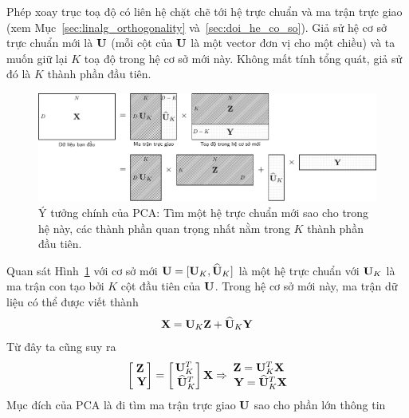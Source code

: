 Phép xoay trục toạ độ có liên hệ chặt chẽ tới hệ trực chuẩn và ma trận trực giao
(xem Mục~\ref{sec:linalg_orthogonality} và~\ref{sec:doi_he_co_so}). Giả sử hệ cơ
sở trực chuẩn mới là $\mathbf{U}$ (mỗi cột của $\mathbf{U}$ là một vector đơn vị cho
một chiều) và ta muốn giữ lại $K$ toạ độ trong hệ
cơ sở mới này. Không mất tính tổng quát, giả sử đó là $K$ thành phần đầu tiên.
\begin{figure}[t]
    \centering
    \includegraphics[width = \textwidth]{Chapters/07_DimemsionalityReduction/27_pca/latex/pca_idea.pdf}
    \caption[]{Ý tưởng chính của PCA: Tìm một hệ trực chuẩn mới sao cho trong hệ này, các thành phần quan trọng nhất nằm trong $K$ thành phần đầu tiên.}
    \label{fig:27_3}
\end{figure}
Quan sát Hình~\ref{fig:27_3} với cơ sở mới $\mathbf{U} =
    [\mathbf{U}_K, \widehat{\mathbf{U}}_K]$ là một hệ trực chuẩn với $\mathbf{U}_K$ là ma trận con tạo bởi $K$ cột đầu tiên của $\mathbf{U}$. Trong hệ cơ sở mới này, ma trận dữ liệu có thể được viết thành
\begin{equation}
    \label{eqn:27_8}
    \mathbf{X} = \mathbf{U}_K \mathbf{Z} + \widehat{\mathbf{U}}_K \mathbf{Y}
\end{equation}
Từ đây ta cũng suy ra
\begin{eqnarray}
    \label{eqn:27_9}
    \left[\begin{matrix} \mathbf{Z} \\\ \mathbf{Y} \end{matrix} \right] =
    \left[\begin{matrix} \mathbf{U}_K^T \\\ \widehat{\mathbf{U}}_K^T \end{matrix} \right]\mathbf{X} \Rightarrow
    \begin{matrix}
        \mathbf{Z} = \mathbf{U}_K^T \mathbf{X} \\\
        \mathbf{Y} = \widehat{\mathbf{U}}_K^T\mathbf{X}
    \end{matrix}
\end{eqnarray}
Mục đích của PCA là đi tìm ma trận trực giao $\mathbf{U}$ sao cho phần lớn thông tin
